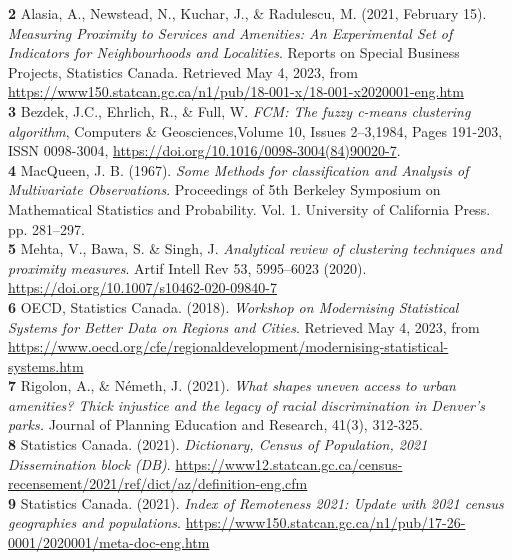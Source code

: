 \documentclass[11pt, a4paper]{article}
\begin{document}
\noindent\textbf{2} Alasia, A., Newstead, N., Kuchar, J., \& Radulescu, M. (2021, February 15). \textit{Measuring Proximity to Services and Amenities: An Experimental Set of Indicators for Neighbourhoods and Localities}. Reports on Special Business Projects, Statistics Canada. Retrieved May 4, 2023, from \sloppy\url{https://www150.statcan.gc.ca/n1/pub/18-001-x/18-001-x2020001-eng.htm}  \\ 

\noindent\textbf{3} Bezdek, J.C., Ehrlich, R., \& Full, W. \textit{FCM: The fuzzy c-means clustering algorithm}, Computers \& Geosciences,Volume 10, Issues 2–3,1984, Pages 191-203, ISSN 0098-3004, \sloppy\url{https://doi.org/10.1016/0098-3004(84)90020-7}. \\ %

\noindent\textbf{4} MacQueen, J. B. (1967). \textit{Some Methods for classification and Analysis of Multivariate Observations}. Proceedings of 5th Berkeley Symposium on Mathematical Statistics and Probability. Vol. 1. University of California Press. pp. 281–297. \\ 

\noindent\textbf{5} Mehta, V., Bawa, S. \& Singh, J. \textit{Analytical review of clustering techniques and proximity measures}. Artif Intell Rev 53, 5995–6023 (2020). \sloppy\url{https://doi.org/10.1007/s10462-020-09840-7} \\

\noindent\textbf{6} OECD, Statistics Canada. (2018). \textit{Workshop on Modernising Statistical Systems for Better Data on Regions and Cities}.  Retrieved May 4, 2023, from \sloppy\url{https://www.oecd.org/cfe/regionaldevelopment/modernising-statistical-systems.htm} \\

\noindent\textbf{7} Rigolon, A., \& Németh, J. (2021). \textit{What shapes uneven access to urban amenities? Thick injustice and the legacy of racial discrimination in Denver’s parks.} Journal of Planning Education and Research, 41(3), 312-325. \\ 

\noindent\textbf{8} Statistics Canada. (2021). \textit{Dictionary, Census of Population, 2021
Dissemination block (DB)}. \sloppy\url{https://www12.statcan.gc.ca/census-recensement/2021/ref/dict/az/definition-eng.cfm} \\

\noindent\textbf{9} Statistics Canada. (2021). \textit{Index of Remoteness 2021: Update with 2021 census geographies and populations}. \sloppy\url{https://www150.statcan.gc.ca/n1/pub/17-26-0001/2020001/meta-doc-eng.htm}


\end{document}
